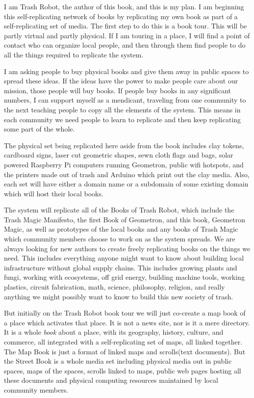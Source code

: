 

I am Trash Robot, the author of this book, and this is my plan. I am
beginning this self-replicating network of books by replicating my own
book as part of a self-replicating set of media. The first step to do
this is a book tour. This will be partly virtual and partly physical. If
I am touring in a place, I will find a point of contact who can organize
local people, and then through them find people to do all the things
required to replicate the system.

I am asking people to buy physical books and give them away in public
spaces to spread these ideas. If the ideas have the power to make people
care about our mission, those people will buy books. If people buy books
in any significant numbers, I can support myself as a mendicant,
traveling from one community to the next teaching people to copy all the
elements of the system. This means in each community we need people to
learn to replicate and then keep replicating some part of the whole.

The physical set being replicated here aside from the book includes clay
tokens, cardboard signs, laser cut geometric shapes, sewn cloth flags
and bags, solar powered Raspberry Pi computers running Geometron, public
wifi hotspots, and the printers made out of trash and Arduino which
print out the clay media. Also, each set will have either a domain name
or a subdomain of some existing domain which will host their local
books.

The system will replicate all of the Books of Trash Robot, which include
the Trash Magic Manifesto, the first Book of Geometron, and this book,
Geometron Magic, as well as prototypes of the local books and any books
of Trash Magic which community members choose to work on as the system
spreads. We are always looking for new authors to create freely
replicating books on the things we need. This includes everything anyone
might want to know about building local infrastructure without global
supply chains. This includes growing plants and fungi, working with
ecosystems, off grid energy, building machine tools, working plastics,
circuit fabrication, math, science, philosophy, religion, and really
anything we might possibly want to know to build this new society of
trash.

But initially on the Trash Robot book tour we will just co-create a map
book of a place which activates that place. It is not a news site, nor
is it a mere directory. It is a whole \emph{book} about a place, with
its geography, history, culture, and commerce, all integrated with a
self-replicating set of maps, all linked together. The Map Book is just
a format of linked maps and scrolls(text documents). But the Street Book
is a whole media set including physical media out in public spaces, maps
of the spaces, scrolls linked to maps, public web pages hosting all
these documents and physical computing resources maintained by local
community members.

